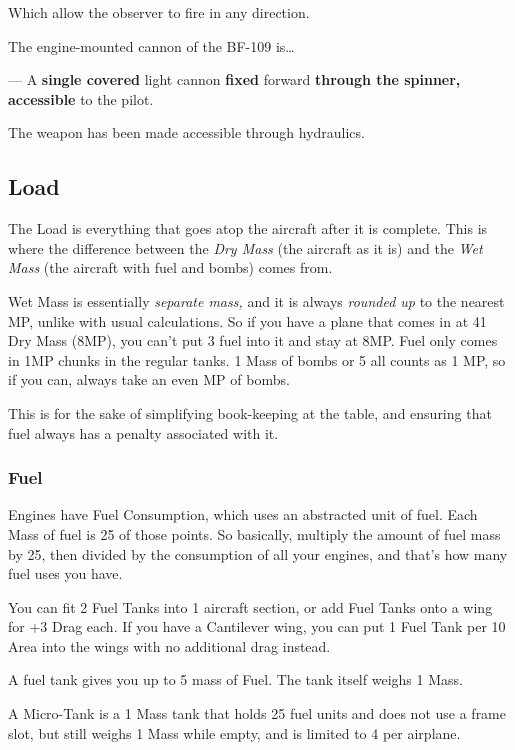 \documentclass{article}
\begin{document}
Which allow the observer to fire in any direction.

The engine-mounted cannon of the BF-109 is\ldots{}

--- A \textbf{single covered }light cannon
\textbf{fixed} forward\textbf{ through the
    spinner, accessible }to the pilot.

The weapon has been made accessible through hydraulics.

\subsection{Load}
\label{_Load}

The Load is everything that goes atop the aircraft after it is complete.
This is where the difference between the \emph{Dry Mass} (the aircraft
as it is) and the \emph{Wet Mass} (the aircraft with fuel and bombs)
comes from.

Wet Mass is essentially \emph{separate mass, }and it is always
\emph{rounded up }to the nearest MP, unlike with usual calculations. So
if you have a plane that comes in at 41 Dry Mass (8MP), you can't put 3
fuel into it and stay at 8MP. Fuel only comes in 1MP chunks in the
regular tanks. 1 Mass of bombs or 5 all counts as 1 MP, so if you can,
always take an even MP of bombs.

This is for the sake of simplifying book-keeping at the table, and
ensuring that fuel always has a penalty associated with it.

\subsubsection{Fuel}
\label{_Fuel}

Engines have Fuel Consumption, which uses an abstracted unit of fuel.
Each Mass of fuel is 25 of those points. So basically, multiply the
amount of fuel mass by 25, then divided by the consumption of all your
engines, and that's how many fuel uses you have.

You can fit 2 Fuel Tanks into 1 aircraft section, or add Fuel Tanks onto
a wing for +3 Drag each. If you have a Cantilever wing, you can put 1
Fuel Tank per 10 Area into the wings with no additional drag instead.

A fuel tank gives you up to 5 mass of Fuel. The tank itself weighs 1
Mass.

A Micro-Tank is a 1 Mass tank that holds 25 fuel units and does not use
a frame slot, but still weighs 1 Mass while empty, and is limited to 4
per airplane.
\end{document}
